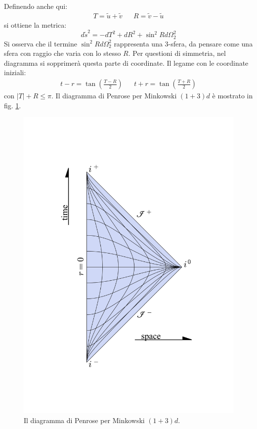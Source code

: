 Definendo anche qui:
\begin{align*}
    T = \tilde{u} + \tilde{v} && R = \tilde{v} - \tilde{u}
\end{align*}
si ottiene la metrica:
\begin{equation*}
    d\tilde{s}^2 = - dT^2 + dR^2 +\sin^2R d\Omega_2^2
\end{equation*}
Si osserva che il termine $\sin^2R d\Omega_2^2$ rappresenta una 3-sfera, da pensare come una sfera con raggio che varia con lo stesso $R$. Per questioni di simmetria, nel diagramma si sopprimerà questa parte di coordinate.
Il legame con le coordinate iniziali:
\begin{align*}
    t - r= \tan\left( \frac{T - R}{2}\right) &&  t + r = \tan\left( \frac{T + R}{2}\right)
\end{align*}
con $|T| + R \leq \pi $. Il diagramma di Penrose per Minkowski $(1+3)d$ è mostrato in fig. \ref{fig.pen_mink_13}.
\begin{figure}
    \centering
    \includegraphics[scale=0.35]{immagini/mink4d.pdf}
    \caption{Il diagramma di Penrose per Minkowski $(1+3)d$.}
    \label{fig.pen_mink_13}
\end{figure}

